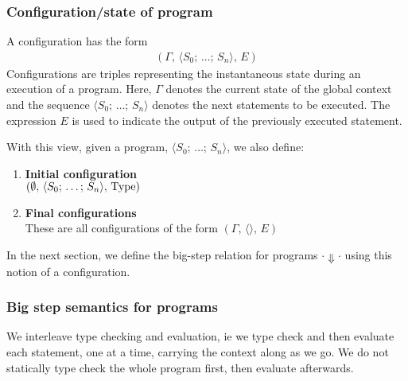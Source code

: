 \documentclass{article}
\begin{document}
\subsubsection{Configuration/state of program}
A configuration has the form
\begin{align*}
  (\Gamma, \, \langle S_0; \, \dots; \, S_n \rangle, \, E)
\end{align*}
Configurations are triples representing the instantaneous state during an
execution of a program. Here, $\Gamma$ denotes the current state of the
global context and the sequence $\langle S_0; \, \dots; \, S_n \rangle$ denotes
the next statements to be executed. 
The expression $E$ is used to indicate the output of the previously executed
statement.

With this view, given a program, $\langle S_0; \, \dots; \, S_n
\rangle$, we also define:
\begin{enumerate}
\item \textbf{Initial configuration} \\
  $ (\emptyset, \, \langle S_0; \, \dots; \, S_n \rangle, \, \operatorname{Type})$
\item \textbf{Final configurations} \\
  These are all configurations of the form
  $(\Gamma, \, \langle \rangle, \, E)$
\end{enumerate}

In the next section, we define the big-step relation for programs $\cdot
\Downarrow \cdot$ using
this notion of a configuration.

\subsubsection{Big step semantics for programs}
We interleave type checking and evaluation, ie we type check and then evaluate
each statement, one at a time, carrying the context along as we go.
We do not statically type check the whole program first, then evaluate
afterwards.
\end{document}
